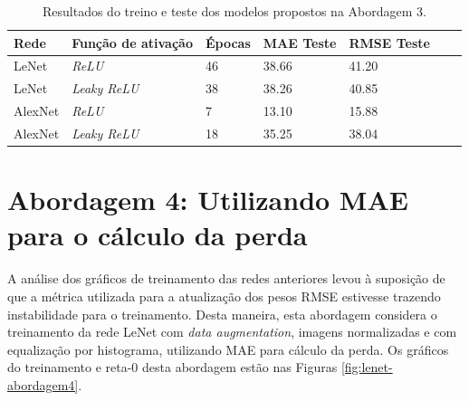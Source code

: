 	\begin{table}[!ht]
		\caption{Resultados do treino e teste dos modelos propostos na Abordagem 3.}
		\label{tab:results-3}
		\centering
		\begin{tabular}{l l l l l l l}
				\toprule
				Rede & Função de ativação & Épocas & MAE Teste & RMSE Teste \\
				\midrule
				LeNet & \emph{ReLU} & 46 &  38.66 & 41.20 \\
				LeNet & \emph{Leaky ReLU} &  38 & 38.26 & 40.85 \\
				AlexNet & \emph{ReLU} & 7 & 13.10 & 15.88 \\
				AlexNet & \emph{Leaky ReLU} & 18 & 35.25 & 38.04 \\
				\bottomrule
			\end{tabular}
	\end{table}

\section{Abordagem 4: Utilizando MAE para o cálculo da perda}%
	A análise dos gráficos de treinamento das redes anteriores levou à suposição de que a métrica utilizada para a atualização dos pesos RMSE estivesse trazendo instabilidade para o treinamento. Desta maneira, esta abordagem considera o treinamento da rede LeNet com \emph{data augmentation}, imagens normalizadas e com equalização por histograma, utilizando MAE para cálculo da perda. Os gráficos do treinamento e reta-0 desta abordagem estão nas Figuras \ref{fig:lenet-abordagem4}.

